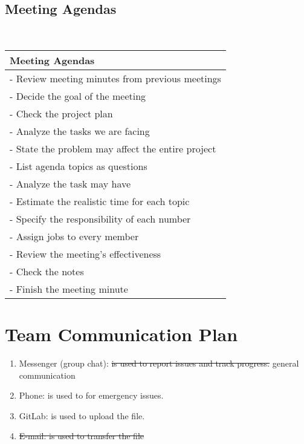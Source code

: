 \documentclass[12pt]{article}
\newcommand\tab[1][1cm]{\hspace*{#1}}
\begin{document}
\subsection{Meeting Agendas}
~\newline
\begin{tabular}{l}

 Meeting Agendas  \\
\hline
 - Review meeting minutes from previous meetings \\
- Decide the goal of the meeting\\
- Check the project plan\\
- Analyze the tasks we are facing\\
- State the problem may affect the entire project\\
- List agenda topics as questions\\
- Analyze the task may have \\
- Estimate the realistic time for each topic\\
- Specify the responsibility of each number\\
- Assign jobs to every member\\
- Review the meeting’s effectiveness\\
- Check the notes\\
- Finish the meeting minute\\


\end{tabular}
\newpage
\section{Team Communication Plan}
\tab
\begin{enumerate}
\item Messenger (group chat):  \st{is used to report issues and track progress.} {\color{red}general communication}
\item Phone: is used to for emergency issues.
\item GitLab: is used to upload the file.
\item \st{E-mail: is used to transfer the file}
\end{enumerate}
\tab
\end{document}

